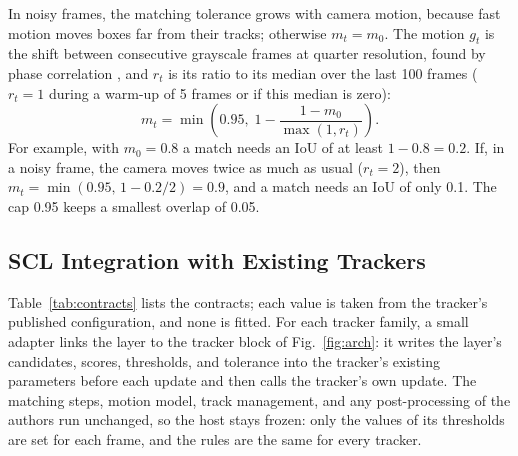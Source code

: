 In noisy frames, the matching tolerance grows with camera motion, because fast motion moves boxes
far from their tracks; otherwise $m_t=m_0$. The motion $g_t$ is the shift between consecutive
grayscale frames at quarter resolution, found by phase correlation \cite{reddy1996phasecorr}, and
$r_t$ is its ratio to its median over the last 100 frames ($r_t=1$ during a warm-up of 5 frames or
if this median is zero):
\begin{equation}
m_t=\min\!\left(0.95,\;1-\frac{1-m_0}{\max(1,r_t)}\right).
\label{eq:motion}
\end{equation}
For example, with $m_0=0.8$ a match needs an IoU of at least $1-0.8=0.2$. If, in a noisy frame,
the camera moves twice as much as usual ($r_t=2$), then $m_t=\min(0.95,\,1-0.2/2)=0.9$, and a match
needs an IoU of only 0.1. The cap 0.95 keeps a smallest overlap of 0.05.

\subsection{SCL Integration with Existing Trackers}\label{sec:contract}
Table~\ref{tab:contracts} lists the contracts; each value is taken from the tracker's published
configuration, and none is fitted. For each tracker family, a small adapter links the layer to the
tracker block of Fig.~\ref{fig:arch}: it writes the layer's candidates, scores, thresholds, and
tolerance into the tracker's existing parameters before each update and then calls the tracker's
own update. The matching steps, motion model, track management, and any post-processing of the
authors run unchanged, so the host stays frozen: only the values of its thresholds are set for
each frame, and the rules are the same for every tracker.


